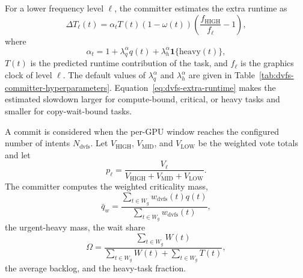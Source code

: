 For a lower frequency level $\ell$, the committer estimates the extra runtime as
\begin{equation}
\Delta T_{\ell}(t)
=
\alpha_t T(t)(1-\omega(t))
\left(\frac{f_{\mathrm{HIGH}}}{f_{\ell}}-1\right),
\label{eq:dvfs-extra-runtime}
\end{equation}
where
\begin{equation}
\alpha_t
=
1+\lambda_q^{\alpha}q(t)+\lambda_h^{\alpha}\mathbf{1}\{\mathrm{heavy}(t)\},
\end{equation}
$T(t)$ is the predicted runtime contribution of the task, and $f_{\ell}$ is the graphics clock of level $\ell$. The default values of $\lambda_q^{\alpha}$ and $\lambda_h^{\alpha}$ are given in Table~\ref{tab:dvfs-committer-hyperparameters}. Equation~\ref{eq:dvfs-extra-runtime} makes the estimated slowdown larger for compute-bound, critical, or heavy tasks and smaller for copy-wait-bound tasks.

A commit is considered when the per-GPU window reaches the configured number of intents $N_{\mathrm{dvfs}}$. Let $V_{\mathrm{HIGH}}$, $V_{\mathrm{MID}}$, and $V_{\mathrm{LOW}}$ be the weighted vote totals and let
\begin{equation}
p_{\ell}=\frac{V_{\ell}}{V_{\mathrm{HIGH}}+V_{\mathrm{MID}}+V_{\mathrm{LOW}}}.
\end{equation}
The committer computes the weighted criticality mass,
\begin{equation}
\bar{q}_{w}=\frac{\sum_{t\in W_g}w_{\mathrm{dvfs}}(t)q(t)}{\sum_{t\in W_g}w_{\mathrm{dvfs}}(t)},
\end{equation}
the urgent-heavy mass, the wait share
\begin{equation}
\Omega=\frac{\sum_{t\in W_g}W(t)}{\sum_{t\in W_g}W(t)+\sum_{t\in W_g}T(t)},
\end{equation}
the average backlog, and the heavy-task fraction.

